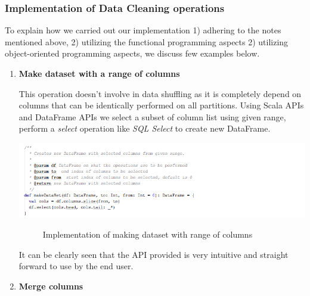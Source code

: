 \subsubsection{Implementation of Data Cleaning operations}
To explain how we carried out our implementation 1) adhering to the notes mentioned above, 2) utilizing the functional programming aspects 2) utilizing object-oriented programming aspects, we discuss few examples below. 
\begin{enumerate}
\item \textbf{Make dataset with a range of columns }

This operation doesn't involve in data shuffling as it is completely depend on columns that can be identically performed on all partitions. Using Scala APIs and DataFrame APIs we select a subset of column list using given range, perform a \textit{select} operation like \textit{SQL Select} to create new DataFrame. 
\begin{center}
\includegraphics[width=38em]{./Figures/take-columns}
\begin{figure}[htbp]
\caption{Implementation of making dataset with range of columns}
\label{fig:take-columns}
\end{figure}
\end{center}
It can be clearly seen that the API provided is very intuitive and straight forward to use by the end user. 
\item \textbf{Merge columns}


\end{enumerate}
